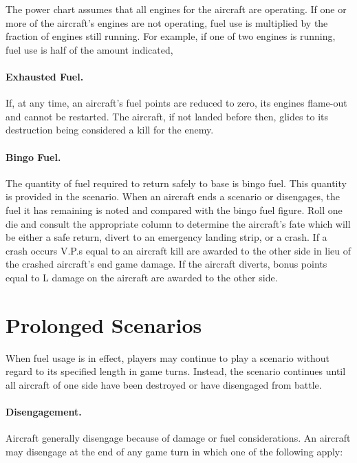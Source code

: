 The power chart assumes that all engines for the aircraft are operating. If one or more of the aircraft's engines are not operating, fuel use is multiplied by the fraction of engines still running. For example, if one of two engines is running, fuel use is half of the amount indicated,

\paragraph{Exhausted Fuel.} If, at any time, an aircraft's fuel points are reduced to zero, its engines flame-out and cannot be restarted. The aircraft, if not landed before then, glides to its destruction being considered a kill for the enemy.


\paragraph{Bingo Fuel.} The quantity of fuel required to return safely to base is bingo fuel. This quantity is provided in the scenario. When an aircraft ends a scenario or disengages, the fuel it has remaining is noted and compared with the bingo fuel figure. Roll one die and consult the appropriate column  to determine the aircraft's fate which will be either a safe return, divert to an emergency landing strip, or a crash. If a crash occurs V.P.s equal to an aircraft kill are awarded to the other side in lieu of the crashed aircraft's end game damage. If the aircraft diverts, bonus points equal to L damage on the aircraft are awarded to the other side.

\section{Prolonged Scenarios}
\label{rule:prolonged-scenarios}

When fuel usage is in effect, players may continue to play a scenario without regard to its specified length in game turns. Instead, the scenario continues until all aircraft of one side have been destroyed or have disengaged from battle.

\paragraph{Disengagement.} Aircraft generally disengage because of damage or fuel considerations. An aircraft may disengage at the end of any game turn in which one of the following apply:

